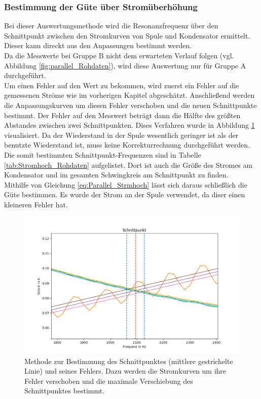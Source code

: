 \documentclass[12pt,a4paper]{article}
\begin{document}
\subsubsection{Bestimmung der Güte über Stromüberhöhung}
Bei dieser Auswertungsmethode wird die Resonanzfrequenz über den Schnittpunkt zwischen den Stromkurven von Spule und Kondensator ermittelt. Dieser kann direckt aus den Anpassungen bestimmt werden.\\
Da die Messwerte bei Gruppe B nicht dem erwarteten Verlauf folgen (vgl. Abbildung \ref{fig:parallel_Rohdaten}), wird diese Auswertung nur für Gruppe A durchgeführt.\\
Um einen Fehler auf den Wert zu bekommen, wird zuerst ein Fehler auf die gemessenen Ströme wie im vorherigen Kapitel abgeschätzt. Anschließend werden die Anpassungskurven um diesen Fehler verschoben und die neuen Schnittpunkte bestimmt. Der Fehler auf den Messwert beträgt dann die Hälfte des größten Abstandes zwischen zwei Schnittpunkten. Dises Verfahren wurde in Abbildung \ref{fig:parallel_Stromhoch} visualisiert.
Da der Wiederstand in der Spule wesentlich geringer ist als der benutzte Wiederstand ist, muss keine Korrekturrechnung durchgeführt werden.\\
Die somit bestimmten Schnittpunkt-Frequenzen sind in Tabelle \ref{tab:Stromhoch_Rohdaten} aufgelistet. Dort ist auch die Größe des Stromes am Kondensator und im gesamten Schwingkreis am Schnittpunkt zu finden. \\
Mithilfe von Gleichung \ref{eq:Parallel_Strmhoch} lässt sich daraus schließlich die Güte bestimmen. Es wurde der Strom an der Spule verwendet, da diser einen kleineren Fehler hat.

\begin{figure}
\centering
\includegraphics[scale=0.7]{Bilder/Parallel_Stromhoch.png}
\caption{Methode zur Bestimmung des Schnittpunktes (mittlere gestrichelte Linie) und seines Fehlers. Dazu werden die Stromkurven um ihre Fehler verschoben und die maximale Verschiebung des Schnittpunktes bestimmt.}
\label{fig:parallel_Stromhoch}
\end{figure}
\end{document}

